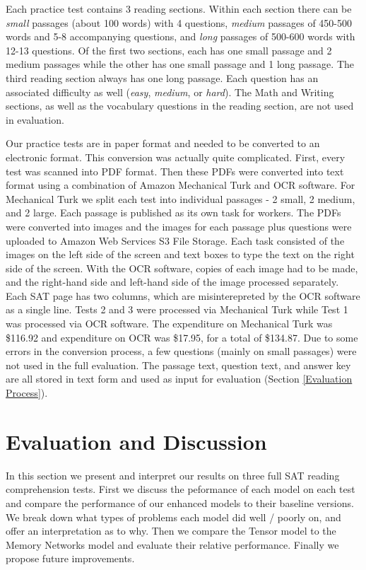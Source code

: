 \documentclass[pageno]{final_paper}
\begin{document}
Each practice test contains 3 reading sections. Within each section there can be
\textit{small} passages (about 100 words) with 4 questions, \textit{medium}
passages of 450-500 words and 5-8 accompanying questions, and \textit{long}
passages of 500-600 words with 12-13 questions. Of the first two sections, each
has one small passage and 2 medium passages while the other has one small
passage and 1 long passage. The third reading section always has one long
passage. Each question has an associated difficulty as well (\textit{easy},
\textit{medium}, or \textit{hard}). The Math and Writing sections, as well as
the vocabulary questions in the reading section, are not used in evaluation.

Our practice tests are in paper format and needed to be converted to an
electronic format. This conversion was actually quite complicated. First, every
test was scanned into PDF format. Then these PDFs were converted into text
format using a combination of Amazon Mechanical Turk and OCR software. For
Mechanical Turk we split each test into individual passages - 2 small, 2 medium,
and 2 large. Each passage is published as its own task for workers. The PDFs
were converted into images and the images for each passage plus questions were
uploaded to Amazon Web Services S3 File Storage. Each task consisted of the
images on the left side of the screen and text boxes to type the text on the
right side of the screen. With the OCR software, copies of each image had to be
made, and the right-hand side and left-hand side of the image processed
separately. Each SAT page has two columns, which are misinterepreted by the OCR
software as a single line. Tests 2 and 3 were processed via Mechanical Turk
while Test 1 was processed via OCR software. The expenditure on Mechanical Turk
was \$116.92 and expenditure on OCR was \$17.95, for a total of \$134.87. Due to
some errors in the conversion process, a few questions (mainly on small
passages) were not used in the full evaluation. The passage text, question text,
and answer key are all stored in text form and used as input for evaluation
(Section \ref{Evaluation Process}).

\section{Evaluation and Discussion}
\label{Evaluation and Discussion}

In this section we present and interpret our results on three full SAT reading
comprehension tests. First we discuss the peformance of each model on each test
and compare the performance of our enhanced models to their baseline versions.
We break down what types of problems each model did well / poorly on, and offer
an interpretation as to why. Then we compare the Tensor model to the Memory
Networks model and evaluate their relative performance. Finally we propose
future improvements.
\end{document}
